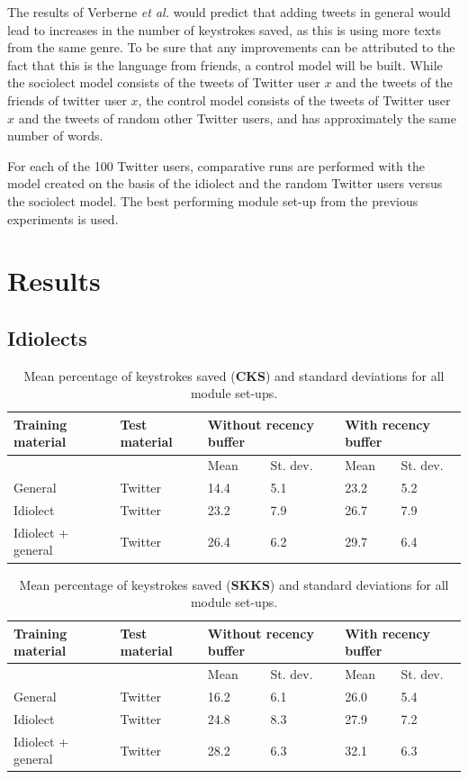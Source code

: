 \documentclass[12pt]{article}
\begin{document}
The results of Verberne {\em et al.} \citeyear{verberne+12} would predict that adding tweets in general would lead to increases in the number of keystrokes saved, as this is using more texts from the same genre. To be sure that any improvements can be attributed to the fact that this is the language from friends, a control model will be built. While the sociolect model consists of the tweets of Twitter user $x$ and the tweets of the friends of twitter user $x$, the control model consists of the tweets of Twitter user $x$ and the tweets of random other Twitter users, and has approximately the same number of words.

For each of the 100 Twitter users, comparative runs are performed with the model created on the basis of the idiolect and the random Twitter users versus the sociolect model. The best performing module set-up from the previous experiments is used.  

\section{Results} \label{results}

\subsection{Idiolects}

\begin{table}[htb] 
\centering
\begin{tabular}{ll|llll} 
Training material&Test material&\multicolumn{2}{l}{Without recency buffer}&\multicolumn{2}{l}{With recency buffer}\\
\hline
&&Mean&St. dev.&Mean&St. dev.\\
General&Twitter&14.4&5.1&23.2&5.2\\
Idiolect&Twitter&23.2&7.9&26.7&7.9\\
Idiolect + general &Twitter&26.4&6.2&29.7&6.4\\
\end{tabular} 
\caption{Mean percentage of keystrokes saved (\textbf{CKS}) and standard deviations for all module set-ups.} \label{twitter_results_cks}
\end{table}

\begin{table}[htb] 
\centering
\begin{tabular}{ll|llll} 
Training material&Test material&\multicolumn{2}{l}{Without recency buffer}&\multicolumn{2}{l}{With recency buffer}\\
\hline
&&Mean&St. dev.&Mean&St. dev.\\
General&Twitter&16.2&6.1&26.0&5.4\\
Idiolect&Twitter&24.8&8.3&27.9&7.2\\
Idiolect + general&Twitter&28.2&6.3&32.1&6.3\\
\end{tabular} 
\caption{Mean percentage of keystrokes saved (\textbf{SKKS}) and standard deviations for all module set-ups.} \label{twitter_results_skks}
\end{table}
\end{document}
